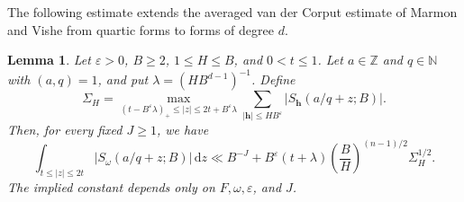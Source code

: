 \documentclass[reqno,a4paper,11pt]{amsart}
\numberwithin{equation}{section}
\newcommand{\ZZ}{\mathbb Z}
\newcommand{\h}{\mathbf h}
\newcommand{\eps}{\varepsilon}
\newcommand{\dint}{\,\mathrm d}
\theoremstyle{plain}
\newtheorem{lemma}[theorem]{Lemma}
\theoremstyle{definition}
\begin{document}
The following estimate extends the averaged van der Corput estimate of Marmon and Vishe \cite[Lemma~3.4]{marmon_vishe_quartic} from quartic forms to forms of degree \(d\).

\begin{lemma}\label{lem:average}
Let \(\eps>0\), \(B\geq2\), \(1\leq H\leq B\), and \(0<t\leq1\).
Let \(a\in\ZZ\) and \(q\in\mathbb N\) with \((a,q)=1\), and put \(\lambda=(HB^{d-1})^{-1}\).
Define
\begin{equation}\label{eq:shift-average}
 \Sigma_H=\max_{(t-B^\eps\lambda)_+\leq |z|
 \leq2t+B^\eps\lambda}
 \sum_{|\h|\leq HB^\eps}|S_{\h}(a/q+z;B)|.
\end{equation}
Then, for every fixed \(J\geq1\), we have
\begin{equation}\label{eq:average}
 \int_{t\leq|z|\leq2t}|S_\omega(a/q+z;B)|\dint z
 \ll B^{-J}+B^\eps(t+\lambda)
 \left(\frac BH\right)^{(n-1)/2}\Sigma_H^{1/2}.
\end{equation}
The implied constant depends only on \(F,\omega,\eps\), and \(J\).
\end{lemma}
\end{document}

